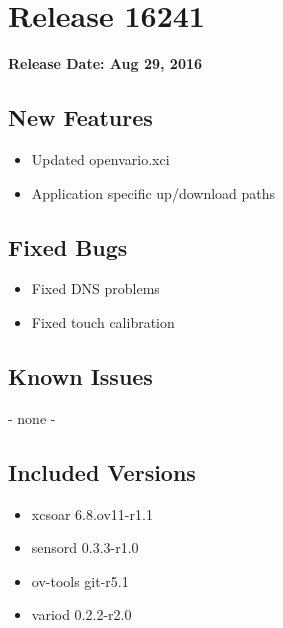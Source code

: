 \chapter*{Release 16241}

\begin{flushleft}
	\textbf{Release Date: Aug 29, 2016}
\end{flushleft}

\section*{New Features}
\begin{itemize}
\item Updated openvario.xci
\item Application specific up/download paths
\end{itemize}


\section*{Fixed Bugs}
\begin{itemize}
\item Fixed DNS problems
\item Fixed touch calibration
\end{itemize}


\section*{Known Issues}
- none -


\section*{Included Versions}

\begin{itemize}
	\item xcsoar 6.8.ov11-r1.1
	\item sensord 0.3.3-r1.0
	\item ov-tools git-r5.1
	\item variod 0.2.2-r2.0
\end{itemize}